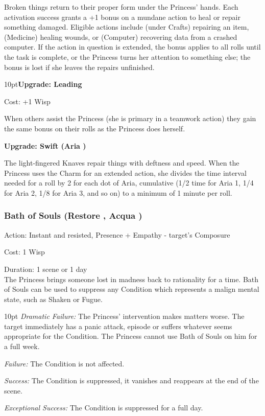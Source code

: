 \noindent Broken things return to their proper form under the Princess' hands. Each activation success grants a +1 bonus on a mundane action to heal or repair something damaged. Eligible actions include (under Crafts) repairing an item, (Medicine) healing wounds, or (Computer) recovering data from a crashed computer. If the action in question is extended, the bonus applies to all rolls until the task is complete, or the Princess turns her attention to something else; the bonus is lost if she leaves the repairs unfinished.
\begin{myindentpar}{10pt}\textbf{Upgrade: Leading}

\noindent Cost: +1 Wisp

When others assist the Princess (she is primary in a teamwork action) they gain the same bonus on their rolls as the Princess does herself.

\textbf{Upgrade: Swift (Aria \textbullet)}

The light-fingered Knaves repair things with deftness and speed. When the Princess uses the Charm for an extended action, she divides the time interval needed for a roll by 2 for each dot of Aria, cumulative (1/2 time for Aria 1, 1/4 for Aria 2, 1/8 for Aria 3, and so on) to a minimum of 1 minute per roll.\end{myindentpar}
\subsubsection*{Bath of Souls (Restore \textbullet\textbullet, Acqua \textbullet)}

\noindent Action: Instant and resisted, Presence + Empathy - target's Composure

\noindent Cost: 1 Wisp

\noindent Duration: 1 scene or 1 day \\

\noindent The Princess brings someone lost in madness back to rationality for a time. Bath of Souls can be used to suppress any Condition which represents a malign mental state, such as Shaken or Fugue. 

\begin{myindentpar}{10pt}    \emph{Dramatic Failure:} The Princess' intervention makes matters worse. The target immediately has a panic attack, episode or suffers whatever seems appropriate for the Condition. The Princess cannot use Bath of Souls on him for a full week.

    \emph{Failure:} The Condition is not affected.

    \emph{Success:} The Condition is suppressed, it vanishes and reappears at the end of the scene.

    \emph{Exceptional Success:} The Condition is suppressed for a full day.

    \end{myindentpar}

